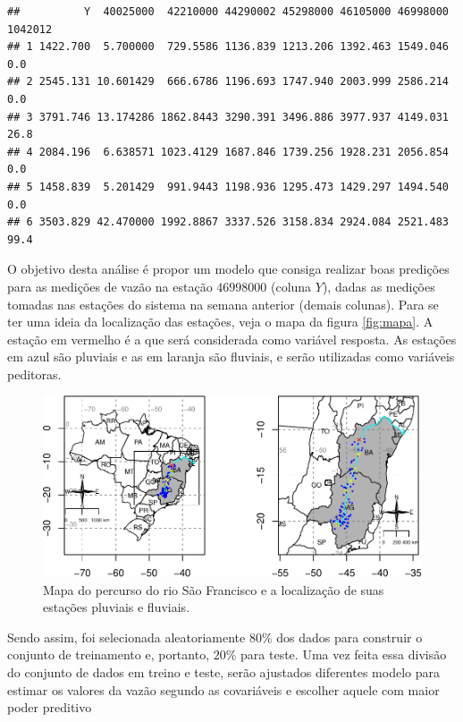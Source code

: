 \documentclass[11pt,]{article}
\begin{document}
\begin{verbatim}
##          Y  40025000  42210000 44290002 45298000 46105000 46998000 1042012
## 1 1422.700  5.700000  729.5586 1136.839 1213.206 1392.463 1549.046     0.0
## 2 2545.131 10.601429  666.6786 1196.693 1747.940 2003.999 2586.214     0.0
## 3 3791.746 13.174286 1862.8443 3290.391 3496.886 3977.937 4149.031    26.8
## 4 2084.196  6.638571 1023.4129 1687.846 1739.256 1928.231 2056.854     0.0
## 5 1458.839  5.201429  991.9443 1198.936 1295.473 1429.297 1494.540     0.0
## 6 3503.829 42.470000 1992.8867 3337.526 3158.834 2924.084 2521.483    99.4
\end{verbatim}

O objetivo desta análise é propor um modelo que consiga realizar boas
predições para as medições de vazão na estação \(46998000\) (coluna
\(Y\)), dadas as medições tomadas nas estações do sistema na semana
anterior (demais colunas). Para se ter uma ideia da localização das
estações, veja o mapa da figura \eqref{fig:mapa}. A estação em vermelho
é a que será considerada como variável resposta. As estações em azul são
pluviais e as em laranja são fluviais, e serão utilizadas como variáveis
peditoras.

\begin{figure}

{\centering \includegraphics[width=0.9\linewidth]{figs/mapa} 

}

\caption{Mapa do percurso do rio São Francisco e a localização de suas estações pluviais e fluviais.}\label{fig:mapa}
\end{figure}

Sendo assim, foi selecionada aleatoriamente \(80\%\) dos dados para
construir o conjunto de treinamento e, portanto, \(20\%\) para teste.
Uma vez feita essa divisão do conjunto de dados em treino e teste, serão
ajustados diferentes modelo para estimar os valores da vazão segundo as
covariáveis e escolher aquele com maior poder preditivo
\end{document}
